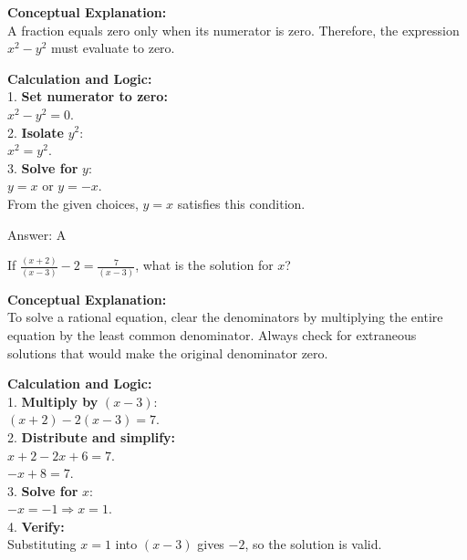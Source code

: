 \documentclass[11pt,paper=a4,answers]{exam}
\begin{document}
\begin{questions}
\begin{solution}
\textbf{Conceptual Explanation:} \\
A fraction equals zero only when its numerator is zero. Therefore, the expression $x^2 - y^2$ must evaluate to zero.

\vspace{30pt}

\textbf{Calculation and Logic:} \\
1. \textbf{Set numerator to zero:} \\
$x^2 - y^2 = 0$. \\
2. \textbf{Isolate } $y^2$: \\
$x^2 = y^2$. \\
3. \textbf{Solve for } $y$: \\
$y = x$ or $y = -x$. \\
From the given choices, $y = x$ satisfies this condition.

\vspace{30pt}

Answer: \colorbox{yellow!100}{A}
\end{solution}

\vspace{60pt}

\question
If $\frac{(x+2)}{(x-3)} - 2 = \frac{7}{(x-3)}$, what is the solution for $x$?

\begin{solution}
\textbf{Conceptual Explanation:} \\
To solve a rational equation, clear the denominators by multiplying the entire equation by the least common denominator. Always check for extraneous solutions that would make the original denominator zero.

\vspace{30pt}

\textbf{Calculation and Logic:} \\
1. \textbf{Multiply by } $(x-3)$: \\
$(x+2) - 2(x-3) = 7$. \\
2. \textbf{Distribute and simplify:} \\
$x + 2 - 2x + 6 = 7$. \\
$-x + 8 = 7$. \\
3. \textbf{Solve for } $x$: \\
$-x = -1 \Rightarrow x = 1$. \\
4. \textbf{Verify:} \\
Substituting $x=1$ into $(x-3)$ gives $-2$, so the solution is valid.


\end{solution}
\end{questions}
\end{document}

